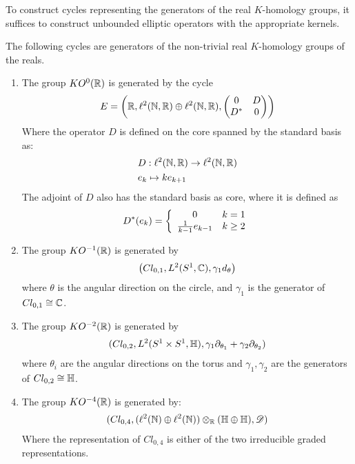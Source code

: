 To construct cycles representing the generators of the real $K$-homology groups, it suffices to construct unbounded elliptic operators with the appropriate kernels. 
\begin{theorem}
	The following cycles are generators of the non-trivial real $K$-homology groups of the reals. 
	\begin{enumerate}
	\item
	The group $KO^0(\mathbb{R})$ is generated by the cycle 
	\begin{align*}
		E=\left ( \mathbb{R}, \ell^2(\mathbb{N},\mathbb{R})\oplus \ell^2(\mathbb{N},\mathbb{R}), \begin{pmatrix} 0 & D \\ D^* & 0\end{pmatrix} \right )
	\end{align*}
	Where the operator $D$ is defined on the core spanned by the standard basis as:
	\begin{align*}
		&D:\ell^2(\mathbb{N},\mathbb{R})\to \ell^2(\mathbb{N},\mathbb{R}) \\
		&e_k\mapsto ke_{k+1}
	\end{align*}
	The adjoint of $D$ also has the standard basis as core, where it is defined as 
	\begin{align*}
		D^*(e_k)=\left \{\begin{array}{c c} 0 & k=1 \\ \frac{1}{k-1}e_{k-1} &  k\geq 2 \end{array} \right .
	\end{align*}

	\item
		The group $KO^{-1}(\mathbb{R})$ is generated by 
		\begin{align*}
			\left ( Cl_{0,1}, L^2(S^1,\mathbb{C}), \gamma_1 d_\theta \right )
		\end{align*}
		where $\theta$ is the angular direction on the circle, and $\gamma_1$ is the generator of $Cl_{0,1}\cong \mathbb{C}$. 
	\item
		The group $KO^{-2}(\mathbb{R})$ is generated by 
		\begin{align*}
			(Cl_{0,2},L^2(S^1\times S^1,\mathbb{H}),\gamma_1 \partial_{\theta_1}+\gamma_2 \partial_{\theta_2})
		\end{align*}
		where $\theta_i$ are the angular directions on the torus and $\gamma_1,\gamma_2$ are the generators of $Cl_{0,2}\cong \mathbb{H}$.
	\item
		The group $KO^{-4}(\mathbb{R})$ is generated by:
			\begin{align*}
		(Cl_{0,4},(\ell^2(\mathbb{N})\oplus \ell^2(\mathbb{N}))\otimes_{\mathbb{R}} (\mathbb{H}\oplus \mathbb{H}),\mathscr{D})
	\end{align*}
		Where the representation of $Cl_{0,4}$ is either of the two irreducible graded representations. 


	\end{enumerate}
\end{theorem}
